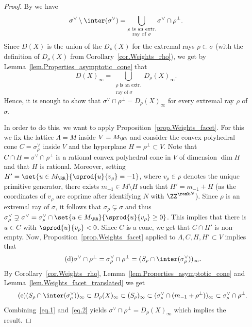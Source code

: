 \begin{proof}
By \cite[Propty\,(7), p.\,10]{Fu1993Introduction-to-to} we have
\[
\sigma^\vee \setminus \inter(\sigma^\vee) = \bigcup_{\substack{
\textrm{$\rho$ is an extr.} \\
\textrm{ray of $\sigma$}
}} \sigma^\vee \cap \rho^\bot.
\]
Since $D(X)$ is the union of the $D_{\rho}(X)$ for the extremal rays $\rho \subset \sigma$
(with the definition of $D_\rho(X)$ from Corollary~\ref{cor.Weights_rho}),
we get by Lemma~\ref{lem.Properties_asymptotic_cone} that
\[
D(X)_{\infty} = \bigcup_{\substack{
\textrm{$\rho$ is an extr.} \\
\textrm{ray of $\sigma$}
}} D_{\rho}(X)_{\infty}.
\]
Hence, it is enough to show that $\sigma^\vee \cap \rho^\bot = D_{\rho}(X)_{\infty}$
for every extremal ray $\rho$ of $\sigma$.

In order to do this,
we want to apply Proposition~\ref{prop.Weights_facet}.
For this we fix the lattice $\Lambda = M$ inside $V = M_{\RR}$ and consider
the convex polyhedral cone $C =\sigma_{\rho}^\vee$ inside $V$
and the hyperplane $H = \rho^\bot \subset V$. Note that
$C \cap H = \sigma^\vee \cap \rho^\bot$ is a rational convex polyhedral cone in $V$ of dimension
$\dim H$ and that $H$ is rational.
Moreover, setting $H' = \set{u \in M_{\RR}}{\sprod{u}{v_{\rho}} =-1}$, where $v_\rho \in \rho$
denotes the unique primitive generator,
there exists $m_{-1} \in M \setminus H$ such that $H' = m_{-1} + H$ (as the coordinates
of $v_{\rho}$ are coprime after identifying $N$ with $\ZZ^{\rank N}$).
Since $\rho$ is an extremal ray
of $\sigma$, it follows that $\sigma_{\rho} \subsetneq \sigma$ and thus
$\sigma_{\rho}^\vee \supsetneq \sigma^\vee =
\sigma_{\rho}^\vee \cap \set{u \in M_{\RR}}{\sprod{u}{v_{\rho}}\geq 0}$. This implies that
there is $u \in C$ with $\sprod{u}{v_{\rho}}<0$. Since $C$
is a cone, we get that $C \cap H'$ is non-empty. Now, Proposition~\ref{prop.Weights_facet} applied to $\Lambda, C, H, H' \subset V$
implies that
\[
\label{eq.1}
\tag{d}
\sigma^\vee \cap \rho^\bot = \sigma_{\rho}^\vee \cap \rho^\bot =
(S_{\rho} \cap \inter(\sigma_{\rho}^\vee))_{\infty}.
\]
By Corollary~\ref{cor.Weights_rho}, Lemma~\ref{lem.Properties_asymptotic_cone}
and Lemma~\ref{lem.Weights_facet_translated} we get
\[
\label{eq.2}
\tag{e}
(S_{\rho} \cap \inter(\sigma_{\rho}^\vee))_{\infty} \subset D_{\rho}(X)_{\infty}
\subset (S_{\rho})_{\infty}
\subset (\sigma_{\rho}^\vee \cap (m_{-1} + \rho^\bot))_{\infty}
\subset \sigma_{\rho}^\vee \cap \rho^\bot
.
\]
Combining~\eqref{eq.1} and~\eqref{eq.2} yields
$\sigma^\vee \cap \rho^\bot = D_{\rho}(X)_{\infty}$ which implies the result.
\end{proof}

